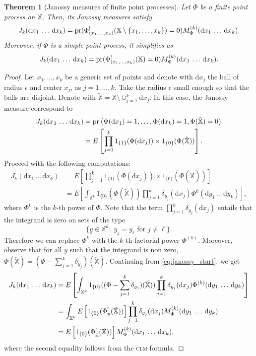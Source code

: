 \documentclass[11pt,a4paper,oneside]{article}
\newcommand{\indicator}{\ensuremath{{1}}}
\newcommand{\dd}{\mathrm d}
\newcommand{\E}{E}
\newcommand{\X}{\mathbb{X}}
\newcommand{\prob}{{\rm pr}}
\newtheorem{theorem}{Theorem}
\theoremstyle{definition}
\theoremstyle{remark}
\begin{document}
\begin{theorem}[Janossy measures of finite point processes]\label{thm:janossy_general}
Let $\Phi$ be a finite point process on $\X$. Then, its Janossy measures satisfy
\[
J_k(\dd x_1\,\ldots\, \dd x_k) = \prob(\Phi^!_{(x_1,\ldots,x_k)}(\X\setminus \{x_1,\ldots,x_k\} ) = 0)  M^{(k)}_{\Phi}(\dd x_1\,\ldots\, \dd x_k).
\]
Moreover, if $\Phi$ is a simple point process, it simplifies as
\[
J_k(\dd x_1\,\ldots\, \dd x_k) = \prob(\Phi^!_{(x_1,\ldots,x_k)}(\X) = 0)  M^{(k)}_{\Phi}(\dd x_1\,\ldots\, \dd x_k).
\]
\end{theorem}
\begin{proof}
Let $x_1,\ldots,x_k$ be a generic set of points and denote with $\dd x_j$ the ball of radius $\epsilon$ and center $x_j$, as $j = 1,\ldots,k$. Take the radius $\epsilon$ small enough so that the balls are disjoint. Denote with $\tilde{\X} = \X \setminus \cup_{j=1}^k \dd x_j$. In this case, the Janossy measure correspond to
\[
\begin{split}
J_k(\dd x_1\,\ldots\,\dd x_k) & = \prob\left( \Phi(\dd x_1) = 1,\ldots, \Phi(\dd x_k ) = 1, \Phi(\tilde{\X}) = 0 \right) \\
&= \E\left[ \prod_{j=1}^k \indicator_{\{1\}}(\Phi(\dd x_j)) \times \indicator_{\{0\}} (\Phi(\tilde{\X})) \right].
\end{split}
\]
Proceed with the following computations:
\begin{equation}\label{eq:janossy_start}
\begin{aligned}
    J_k(\dd x_1\,\ldots\,\dd x_k) &= \E\left[ \prod_{j=1}^k \indicator_{\{1\}}(\Phi(\dd x_j)) \times \indicator_{\{0\}} (\Phi(\tilde{\X})) \right]\\
    &= \E\left[ \int_{\X^k} \indicator_{\{0\}} (\Phi(\tilde{\X})) \prod_{j=1}^k \delta_{y_j} (\dd x_j) \Phi^k(\dd y_1\,\ldots\, \dd y_k)  \right],
\end{aligned}
\end{equation}
where $\Phi^k$ is the $k$-th power of $\Phi$. Note that the term $\prod_{j=1}^k \delta_{y_j}(\dd x_j)$ entails that the integrand is zero on sets of the type
\[
    \{\underline{y} \in \X^k : \; y_j = y_\ell \text{ for } j \neq \ell \}.
\]
Therefore we can replace $\Phi^k$ with the $k$-th factorial power $\Phi^{(k)}$. Moreover, observe that for all $\underline{y}$ such that the integrand is non zero, $\Phi(\tilde{\X}) = (\Phi - \sum_{j=1}^k \delta_{y_j}) (\tilde{\X})$. Continuing from \eqref{eq:janossy_start}, we get
\begin{align}
        J_k(\dd x_1\,\ldots\,\dd x_k) &= \E\left[ \int_{\X^k} \indicator_{\{0\}} ((\Phi- \sum_{j=1}^k \delta_{y_j})(\tilde{\X})) \prod_{j=1}^k \delta_{y_j} (\dd x_j) \Phi^{(k)}(\dd y_1\,\ldots\, \dd y_k)  \right] \notag\\
        &= \int_{\X^k} \E\left[ \indicator_{\{0\}} ( \Phi^!_{\underline{y}}(\tilde{\X}))\right] \prod_{j=1}^k \delta_{y_j} (\dd x_j) M^{(k)}_{\Phi}(\dd y_1\,\ldots\, \dd y_k) \notag\\
        &= \E\left[ \indicator_{\{0\}} ( \Phi^!_{\underline{x}}(\tilde{\X}))\right] M^{(k)}_{\Phi}(\dd x_1\,\ldots\, \dd x_k), 
\end{align}
where the second equality follows from the \textsc{clm} formula.     
\end{proof}
\end{document}
